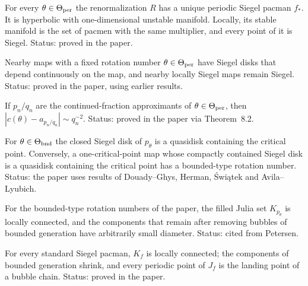 \begin{theorem}
\label{thm:dls-1-1}
For every $\theta\in\Theta_{\rm per}$ the renormalization $R$ has a unique periodic Siegel
pacman $f_*$.  It is hyperbolic with one-dimensional unstable manifold.  Locally, its stable
manifold is the set of pacmen with the same multiplier, and every point of it is Siegel.
Status: proved in the paper.
\end{theorem}

\begin{theorem}
\label{thm:dls-1-2}
Nearby maps with a fixed rotation number $\theta\in\Theta_{\rm per}$ have Siegel disks that
depend continuously on the map, and nearby locally Siegel maps remain Siegel.  Status:
proved in the paper, using earlier results.
\end{theorem}

\begin{theorem}
\label{thm:dls-1-3}
If $p_n/q_n$ are the continued-fraction approximants of $\theta\in\Theta_{\rm per}$, then
$|c(\theta)-a_{p_n/q_n}|\sim q_n^{-2}$.  Status: proved in the paper via Theorem~8.2.
\end{theorem}

\begin{theorem}
\label{thm:dls-3-2}
For $\theta\in\Theta_{\rm bnd}$ the closed Siegel disk of $p_\theta$ is a quasidisk containing
the critical point.  Conversely, a one-critical-point map whose compactly contained Siegel
disk is a quasidisk containing the critical point has a bounded-type rotation number.  Status:
the paper uses results of Douady--Ghys, Herman, Świątek and Avila--Lyubich.
\end{theorem}

\begin{theorem}
\label{thm:dls-petersen}
For the bounded-type rotation numbers of the paper, the filled Julia set $K_{p_\theta}$ is locally connected,
and the components that remain after removing bubbles of bounded generation have arbitrarily small
diameter.  Status: cited from Petersen.
\end{theorem}

\begin{theorem}
\label{thm:dls-3-12}
For every standard Siegel pacman, $K_f$ is locally connected; the components of bounded
generation shrink, and every periodic point of $J_f$ is the landing point of a bubble chain.
Status: proved in the paper.
\end{theorem}

